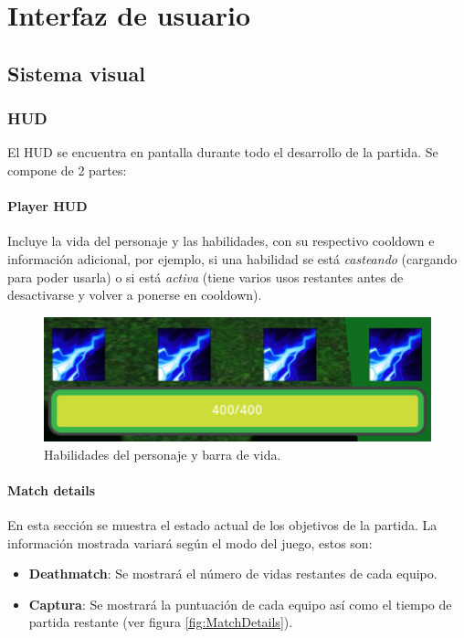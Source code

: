 \chapter{Interfaz de usuario}


\section{Sistema visual}
\subsection{HUD}

El HUD se encuentra en pantalla durante todo el desarrollo de la partida. Se compone de 2 partes:

\subsubsection{Player HUD}
Incluye la vida del personaje y las habilidades, con su respectivo cooldown e información adicional, por ejemplo, si una habilidad se está \emph{casteando} (cargando para poder usarla) o si está \emph{activa} (tiene varios usos restantes antes de desactivarse y volver a ponerse en cooldown).

\begin{figure}[h]
	\centering
	\includegraphics[width=0.8\linewidth]{figures/PlayerHUD}
	\caption{Habilidades del personaje y barra de vida.}
	\label{fig:PlayerHUD}
\end{figure}

\subsubsection{Match details}
En esta sección se muestra el estado actual de los objetivos de la partida. La información mostrada variará según el modo del juego, estos son:
\begin{itemize}
	\item \textbf{Deathmatch}: Se mostrará el número de vidas restantes de cada equipo.
	\item \textbf{Captura}: Se mostrará la puntuación de cada equipo así como el tiempo de partida restante (ver figura \ref{fig:MatchDetails}).
\end{itemize}

